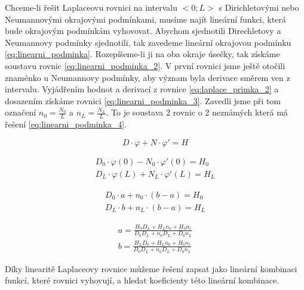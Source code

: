 \documentclass{book}
\begin{document}
Chceme-li řešit Laplaceovu rovnici na intervalu \(<0; L>\) s Dirichletovými nebo Neumannovými okrajovými podmínkami, musíme najít lineární funkci,
která bude okrajovým podmínkám vyhovovat. Abychom sjednotili Direchletovy a Neumannovy podmínky sjednotili, tak zavedeme lineární
okrajovou podmínku \eqref{eq:linearni_podminka}. Rozepíšeme-li ji na oba okraje úsečky, tak získáme soustavu rovnic \eqref{eq:linearni_podminka_2}.
V první rovnici jsme ještě otočili znaménko u Neumannovy podmínky, aby význam byla derivace směrem ven z intervalu.
Vyjádřením hodnot a derivací z rovnice \eqref{eq:laplace_primka_2} a dosazením získáme rovnici \eqref{eq:linearni_podminka_3}. Zavedli jsme při tom
označení \(n_0 = \frac{N_0}{L}\) a \(n_L = \frac{N_L}{L}\).
To je soustava 2 rovnic o 2 neznámých která má řešení \eqref{eq:linearni_podminka_4}.

\begin{equation}
\label{eq:linearni_podminka}
D \cdot \varphi + N \cdot \varphi' = H
\end{equation}

\begin{equation}
\label{eq:linearni_podminka_2}
\begin{split}
D_0 \cdot \varphi(0) - N_0 \cdot \varphi'(0) = H_0 \\
D_L \cdot \varphi(L) + N_L \cdot \varphi'(L) = H_L
\end{split}
\end{equation}

\begin{equation}
\label{eq:linearni_podminka_3}
\begin{split}
D_0 \cdot a + n_0 \cdot (b - a) = H_0 \\
D_L \cdot b + n_L \cdot (b - a) = H_L
\end{split}
\end{equation}

\begin{equation}
\label{eq:linearni_podminka_4}
\begin{split}
a = \frac{H_0 D_L + H_L n_0 + H_0 n_l}{D_0 D_L + n_0 D_L + D_0 n_L} \\
b = \frac{H_L D_0 + H_L n_0 + H_0 n_l}{D_0 D_L + n_0 D_L + D_0 n_L}
\end{split}
\end{equation}

\begin{fact}
Díky linearitě Laplaceovy rovnice můžeme řešení zapsat jako lineární kombinaci funkcí, které rovnici vyhovují, a hledat
koeficienty této lineární kombinace.
\end{fact}
\end{document}

